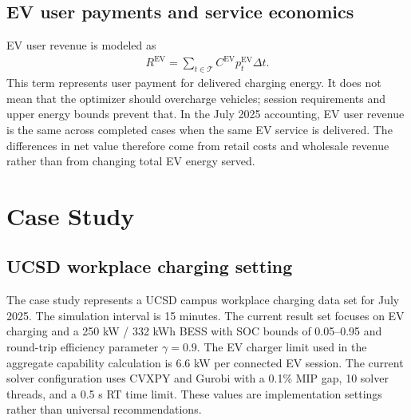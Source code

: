 \documentclass[final,5p,times]{elsarticle}
\newcommand{\DeltaT}{\Delta t}
\newcommand{\EV}{\mathrm{EV}}
\newcommand{\calT}{\mathcal{T}}
\begin{document}
\subsection{EV user payments and service economics}
EV user revenue is modeled as
\begin{align}
R^{\EV}=\sum_{t\in\calT} C^{\EV}p_t^{\EV}\DeltaT.
\label{eq:ev_revenue_main}
\end{align}
This term represents user payment for delivered charging energy. It does not mean that the optimizer should overcharge vehicles; session requirements and upper energy bounds prevent that. In the July 2025 accounting, EV user revenue is the same across completed cases when the same EV service is delivered. The differences in net value therefore come from retail costs and wholesale revenue rather than from changing total EV energy served.

\section{Case Study}
\label{sec:case_study}

\subsection{UCSD workplace charging setting}
The case study represents a UCSD campus workplace charging data set for July 2025. The simulation interval is 15 minutes. The current result set focuses on EV charging and a 250 kW / 332 kWh BESS with SOC bounds of 0.05--0.95 and round-trip efficiency parameter $\gamma=0.9$. The EV charger limit used in the aggregate capability calculation is 6.6 kW per connected EV session. The current solver configuration uses CVXPY and Gurobi with a 0.1\% MIP gap, 10 solver threads, and a 0.5 s RT time limit. These values are implementation settings rather than universal recommendations.
\end{document}
